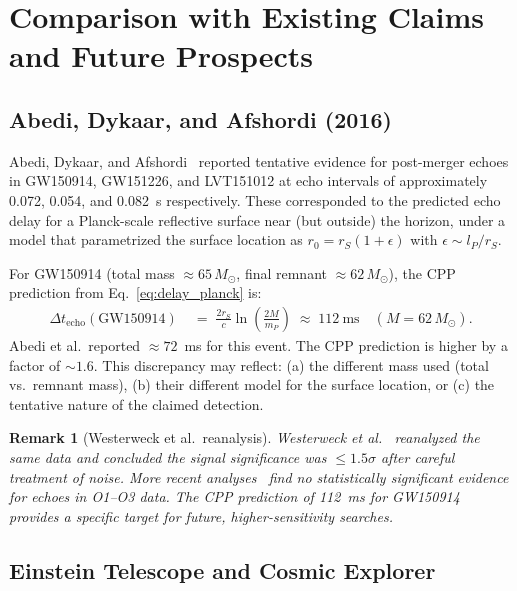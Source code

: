 \documentclass[12pt]{article}
\newtheorem{remark}[theorem]{Remark}
\newcommand{\lP}{l_P}
\newcommand{\mP}{m_P}
\newcommand{\rS}{r_S}
\newcommand{\Dt}{\Delta t_{\mathrm{echo}}}
\begin{document}
\section{Comparison with Existing Claims and Future Prospects}
\label{sec:comparison}

\subsection{Abedi, Dykaar, and Afshordi (2016)}

Abedi, Dykaar, and Afshordi~\cite{abedi2016} reported tentative evidence
for post-merger echoes in GW150914, GW151226, and LVT151012 at echo
intervals of approximately 0.072, 0.054, and 0.082~s respectively.  These
corresponded to the predicted echo delay for a Planck-scale reflective
surface near (but outside) the horizon, under a model that parametrized
the surface location as $r_0 = \rS(1 + \epsilon)$ with $\epsilon \sim
\lP/\rS$.

For GW150914 (total mass $\approx\!65\,M_\odot$, final remnant
$\approx\!62\,M_\odot$), the CPP prediction from
Eq.~\eqref{eq:delay_planck} is:
\begin{align}
  \Dt(\text{GW150914})
  &\;=\; \frac{2\rS}{c}\ln\!\left(\frac{2M}{\mP}\right)
  \;\approx\; 112\ \mathrm{ms} \quad (M = 62\,M_\odot).
  \label{eq:gw150914}
\end{align}
Abedi et al.\ reported $\approx\!72$~ms for this event.  The CPP
prediction is higher by a factor of $\sim\!1.6$.  This discrepancy
may reflect: (a) the different mass used (total vs.\ remnant mass),
(b) their different model for the surface location, or (c) the
tentative nature of the claimed detection.

\begin{remark}[Westerweck et al.\ reanalysis]
Westerweck et al.~\cite{westerweck2018} reanalyzed the same data and
concluded the signal significance was $\leq\!1.5\sigma$ after careful
treatment of noise.  More recent analyses~\cite{conti2024} find no
statistically significant evidence for echoes in O1--O3 data.  The
CPP prediction of 112~ms for GW150914 provides a specific target for
future, higher-sensitivity searches.
\end{remark}

\subsection{Einstein Telescope and Cosmic Explorer}
\end{document}
